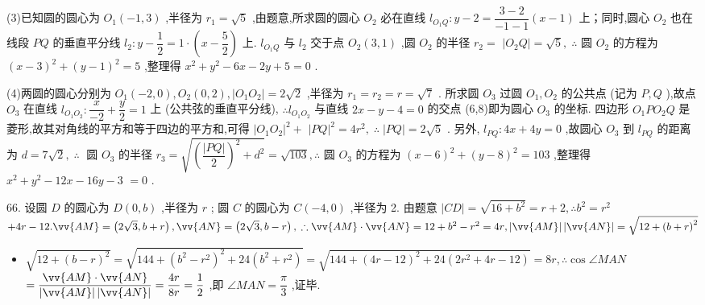 (3)已知圆的圆心为 ${O}_{1}\left( {-1,3}\right)$ ,半径为 ${r}_{1} = \sqrt{5}$ ,由题意,所求圆的圆心 ${O}_{2}$ 必在直线 ${l}_{{O}_{1}Q} : y - 2 = \dfrac{3 - 2}{-1 - 1}\left( {x - 1}\right)$ 上；同时,圆心 ${O}_{2}$ 也在线段 ${PQ}$ 的垂直平分线 ${l}_{2} : y - \dfrac{1}{2} = 1 \cdot  \left( {x - \dfrac{5}{2}}\right)$ 上. ${l}_{{O}_{1}Q}$ 与 ${l}_{2}$ 交于点 ${O}_{2}\left( {3,1}\right)$ ,圆 ${O}_{2}$ 的半径 ${r}_{2} =$  $\left| {{O}_{2}Q}\right|  = \sqrt{5},\;\therefore$ 圆 ${O}_{2}$ 的方程为 ${\left( x - 3\right) }^{2} + {\left( y - 1\right) }^{2} = 5$ ,整理得 ${x}^{2} + {y}^{2} - {6x} - {2y} + 5 = 0$ .

(4)两圆的圆心分别为 ${O}_{1}\left( {-2,0}\right) ,{O}_{2}\left( {0,2}\right) ,\left| {{O}_{1}{O}_{2}}\right|  = 2\sqrt{2}$ ,半径为 ${r}_{1} = {r}_{2} = r = \sqrt{7}$ . 所求圆 ${O}_{3}$ 过圆 ${O}_{1},{O}_{2}$ 的公共点 (记为 $P,Q$ ),故点 ${O}_{3}$ 在直线 ${l}_{{O}_{1}{O}_{2}} : \dfrac{x}{-2} + \dfrac{y}{2} = 1$ 上 (公共弦的垂直平分线), $\therefore {l}_{{O}_{1}{O}_{2}}$ 与直线 ${2x} - y - 4 = 0$ 的交点 (6,8)即为圆心 ${O}_{3}$ 的坐标. 四边形 ${O}_{1}P{O}_{2}Q$ 是菱形,故其对角线的平方和等于四边的平方和,可得 ${\left| {O}_{1}{O}_{2}\right| }^{2} +$  ${\left| PQ\right| }^{2} = 4{r}^{2},\;\therefore \;\left| {PQ}\right|  = 2\sqrt{5}$ . 另外, ${l}_{PQ} : {4x} + {4y} = 0$ ,故圆心 ${O}_{3}$ 到 ${l}_{PQ}$ 的距离为 $d = 7\sqrt{2},\;\therefore \;$ 圆 ${O}_{3}$ 的半径 ${r}_{3} = \sqrt{{\left( \dfrac{\left| PQ\right| }{2}\right) }^{2} + {d}^{2}} = \sqrt{103},\therefore$ 圆 ${O}_{3}$ 的方程为 ${\left( x - 6\right) }^{2} + {\left( y - 8\right) }^{2} = {103}$ ,整理得 ${x}^{2} + {y}^{2} - {12x} - {16y} - 3$  $= 0$ .

66. 设圆 $D$ 的圆心为 $D\left( {0,b}\right)$ ,半径为 $r$ ; 圆 $C$ 的圆心为 $C\left( {-4,0}\right)$ ,半径为 2. 由题意 $\left| {CD}\right|  = \sqrt{{16} + {b}^{2}} = r + 2,\therefore {b}^{2} = {r}^{2}$  $+ {4r} - {12}.\vv{AM} = \left( {2\sqrt{3},b + r}\right) ,\vv{AN} = \left( {2\sqrt{3},b - r}\right) ,\;\therefore \vv{AM} \cdot  \vv{AN} = {12} + {b}^{2} - {r}^{2} = {4r},\left| \vv{AM}\right| \left| \vv{AN}\right|  = \sqrt{{12} + {\left( b + r\right) }^{2}}$

\begin{itemize}
\item $\sqrt{{12} + {\left( b - r\right) }^{2}} = \sqrt{{144} + {\left( {b}^{2} - {r}^{2}\right) }^{2} + {24}\left( {{b}^{2} + {r}^{2}}\right) } = \sqrt{{144} + {\left( 4r - {12}\right) }^{2} + {24}\left( {2{r}^{2} + {4r} - {12}}\right) } = {8r},\therefore \cos \angle {MAN}$  $= \dfrac{\vv{AM} \cdot  \vv{AN}}{\left| \vv{AM}\right| \left| \vv{AN}\right| } = \dfrac{4r}{8r} = \dfrac{1}{2}$ ,即 $\angle {MAN} = \dfrac{\pi }{3}$ ,证毕.
\end{itemize}

